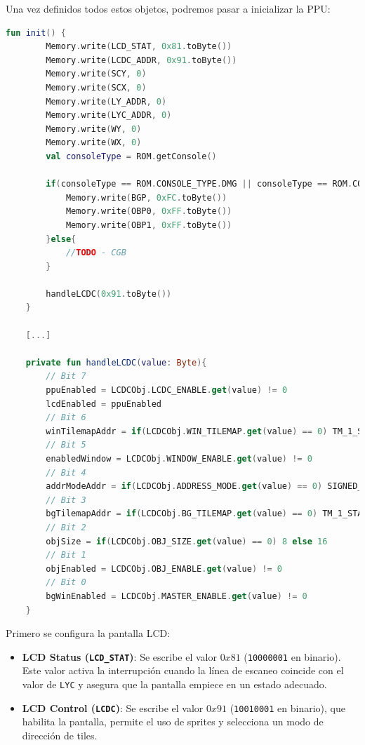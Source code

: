 Una vez definidos todos estos objetos, podremos pasar a inicializar la PPU:\label{handleLCDC}

\begin{lstlisting}[language=Kotlin, caption={Inicialización de la PPU.}, label={code:ppuinit}]
    fun init() {
        Memory.write(LCD_STAT, 0x81.toByte())
        Memory.write(LCDC_ADDR, 0x91.toByte())
        Memory.write(SCY, 0)
        Memory.write(SCX, 0)
        Memory.write(LY_ADDR, 0)
        Memory.write(LYC_ADDR, 0)
        Memory.write(WY, 0)
        Memory.write(WX, 0)
        val consoleType = ROM.getConsole()

        if(consoleType == ROM.CONSOLE_TYPE.DMG || consoleType == ROM.CONSOLE_TYPE.DMG_CGB) {
            Memory.write(BGP, 0xFC.toByte())
            Memory.write(OBP0, 0xFF.toByte())
            Memory.write(OBP1, 0xFF.toByte())
        }else{
            //TODO - CGB
        }

        handleLCDC(0x91.toByte())
    }

    [...]

    private fun handleLCDC(value: Byte){
        // Bit 7
        ppuEnabled = LCDCObj.LCDC_ENABLE.get(value) != 0
        lcdEnabled = ppuEnabled
        // Bit 6
        winTilemapAddr = if(LCDCObj.WIN_TILEMAP.get(value) == 0) TM_1_START else TM_2_START
        // Bit 5
        enabledWindow = LCDCObj.WINDOW_ENABLE.get(value) != 0
        // Bit 4
        addrModeAddr = if(LCDCObj.ADDRESS_MODE.get(value) == 0) SIGNED_TILE_REGION else VRAM_START
        // Bit 3
        bgTilemapAddr = if(LCDCObj.BG_TILEMAP.get(value) == 0) TM_1_START else TM_2_START
        // Bit 2
        objSize = if(LCDCObj.OBJ_SIZE.get(value) == 0) 8 else 16
        // Bit 1
        objEnabled = LCDCObj.OBJ_ENABLE.get(value) != 0
        // Bit 0
        bgWinEnabled = LCDCObj.MASTER_ENABLE.get(value) != 0
    }
\end{lstlisting}

Primero se configura la pantalla LCD:

\begin{itemize}
    \item \textbf{LCD Status (\texttt{LCD\_STAT})}: Se escribe el valor $0x81$ (\texttt{10000001} en binario). Este valor activa la interrupción cuando la línea de escaneo coincide con el valor de \texttt{LYC} y asegura que la pantalla empiece en un estado adecuado.
    \item \textbf{LCD Control (\texttt{LCDC})}: Se escribe el valor $0x91$ (\texttt{10010001} en binario), que habilita la pantalla, permite el uso de sprites y selecciona un modo de dirección de tiles.
\end{itemize}

